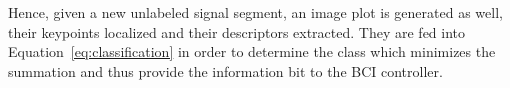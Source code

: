 Hence, given a new unlabeled signal segment, an image plot is generated as well, their keypoints localized and their descriptors extracted.  They are fed into Equation~\ref{eq:classification} in order to determine the class which minimizes the summation and thus provide the information bit to the BCI controller.  

%
%
%



